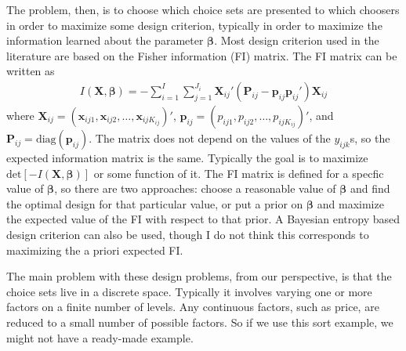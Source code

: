 \documentclass[12pt]{article}
\begin{document}
The problem, then, is to choose which choice sets are presented to which choosers in order to maximize some design criterion, typically in order to maximize the information learned about the parameter $\bm{\beta}$. Most design criterion used in the literature are based on the Fisher information (FI) matrix. The FI matrix can be written as
\begin{align*}
I(\bm{X},\bm{\beta}) = -\sum_{i=1}^I\sum_{j=1}^{J_i}\bm{X}_{ij}'(\bm{P}_{ij} - \bm{p}_{ij}\bm{p}_{ij}')\bm{X}_{ij}
\end{align*}
where $\bm{X}_{ij} = (\bm{x}_{ij1}, \bm{x}_{ij2}, \dots, \bm{x}_{ijK_{ij}})'$, $\bm{p}_{ij} = (p_{ij1}, p_{ij2}, \dots, p_{ijK_{ij}})'$, and $\bm{P}_{ij}=\mathrm{diag}(\bm{p}_{ij})$. The matrix does not depend on the values of the $y_{ijk}$s, so the expected information matrix is the same. Typically the goal is to maximize $\mathrm{det}[-I(\bm{X},\bm{\beta})]$ or some function of it. The FI matrix is defined for a specfic value of $\bm{\beta}$, so there are two approaches: choose a reasonable value of $\bm{\beta}$ and find the optimal design for that particular value, or put a prior on $\bm{\beta}$ and maximize the expected value of the FI with respect to that prior. A Bayesian entropy based design criterion can also be used, though I do not think this corresponds to maximizing the a priori expected FI.

The main problem with these design problems, from our perspective, is that the choice sets live in a discrete space. Typically it involves varying one or more factors on a finite number of levels. Any continuous factors, such as price, are reduced to a small number of possible factors. So if we use this sort example, we might not have a ready-made example.
\end{document}
